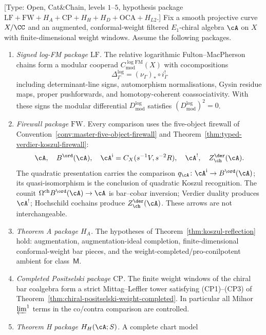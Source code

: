 \begin{theorem}
\label{thm:grand-unification-platonic}
\ClaimStatusConditional
\textup{[Type: Open, Cat\&Chain, levels $1$--$5$, hypothesis package
$\mathrm{LF}+\mathrm{FW}+H_A+\mathrm{CP}+H_H+H_D+\mathrm{OCA}+H_{L2}$.]}
Fix a smooth projective curve $X/\CC$ and an augmented,
conformal-weight filtered $E_1$-chiral algebra $\cA$ on $X$ with
finite-dimensional weight windows. Assume the following packages.
\begin{enumerate}[label=\textup{(\alph*)}]
\item \emph{Signed log-FM package $\mathrm{LF}$.} The relative
logarithmic Fulton--MacPherson chains form a modular cooperad
$C^{\log\mathrm{FM}}_{\mathrm{mod}}(X)$ with cocompositions
\[
 \Delta_\Gamma^{\log}=(\nu_\Gamma)_*\circ i_\Gamma^!
\]
including determinant-line signs, automorphism normalisations, Gysin
residue maps, proper pushforwards, and homotopy-coherent
coassociativity. With these signs the modular differential
$D_{\mathrm{mod}}^{\log}$ satisfies
$(D_{\mathrm{mod}}^{\log})^2=0$.
\item \emph{Firewall package $\mathrm{FW}$.} Every comparison uses the
five-object firewall of Convention~\ref{conv:master-five-object-firewall}
and Theorem~\ref{thm:typed-verdier-koszul-firewall}:
\[
 \cA,\quad B^{\ord}(\cA),\quad
 \cA^{\mathrm i}=C_X(s^{-1}V,s^{-2}R),\quad
 \cA^!,\quad Z^{\der}_{\ch}(\cA).
\]
The quadratic presentation carries the comparison
$q_\cA\colon\cA^{\mathrm i}\to B^{\ord}(\cA)$; its
quasi-isomorphism is the conclusion of quadratic Koszul recognition.
The counit $\OmCh B^{\ord}(\cA)\to\cA$ is bar--cobar inversion;
Verdier duality produces $\cA^!$; Hochschild cochains produce
$Z^{\der}_{\ch}(\cA)$. These arrows are not interchangeable.
\item \emph{Theorem A package $H_A$.} The hypotheses of
Theorem~\ref{thm:koszul-reflection} hold: augmentation,
augmentation-ideal completion, finite-dimensional conformal-weight bar
pieces, and the weight-completed/pro-conilpotent ambient for
class~$\mathsf M$.
\item \emph{Completed Positselski package $\mathrm{CP}$.} The finite
weight windows of the chiral bar coalgebra form a strict
Mittag--Leffler tower satisfying \textup{(CP1)--(CP3)} of
Theorem~\ref{thm:chiral-positselski-weight-completed}. In particular
all Milnor $\varprojlim^1$ terms in the co/contra comparison are
controlled.
\item \emph{Theorem H package $H_H(\cA;S)$.} A complete chart model

\end{enumerate}
\end{theorem}
